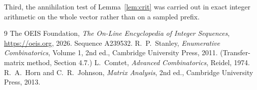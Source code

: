 \documentclass[11pt,a4paper]{article}
\theoremstyle{plain}
\theoremstyle{definition}
\begin{document}
Third, the annihilation test of Lemma~\ref{lem:crit} was carried out in exact integer
arithmetic on the whole vector rather than on a sampled prefix.

\begin{thebibliography}{9}
 The OEIS Foundation, \emph{The On-Line Encyclopedia of Integer
Sequences}, \url{https://oeis.org}, 2026. Sequence A239532.
 R.~P.~Stanley, \emph{Enumerative Combinatorics}, Volume 1, 2nd ed.,
Cambridge University Press, 2011. (Transfer-matrix method, Section 4.7.)
 L.~Comtet, \emph{Advanced Combinatorics}, Reidel, 1974.
 R.~A.~Horn and C.~R.~Johnson, \emph{Matrix Analysis}, 2nd ed., Cambridge
University Press, 2013.
\end{thebibliography}
\end{document}
